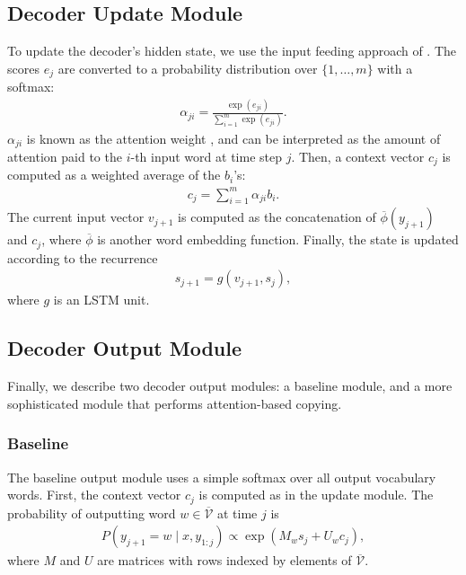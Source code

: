 \documentclass[11pt,letterpaper]{article}
\newcommand{\vocabout}{\overline{\mathcal{V}}}
\newcommand{\phiout}{\overline{\phi}}
\begin{document}
\subsection{Decoder Update Module}
To update the decoder's hidden state,
we use the input feeding approach of .
The scores $e_j$ are converted to a probability distribution 
over $\{1, \dotsc, m\}$ with a softmax:
\begin{align}
  \alpha_{ji} = \frac{\exp(e_{ji})}{\sum_{i=1}^m \exp(e_{ji})}.
\end{align}
$\alpha_{ji}$ is known as the attention weight \cite{bahdanau2014neural},
and can be interpreted as the amount of attention
paid to the $i$-th input word at time step $j$.
Then, a context vector $c_j$ is computed as a weighted average of the $b_i$'s:
\begin{align}
  c_j = \sum_{i=1}^m \alpha_{ji} b_i.
\end{align}
The current input vector $v_{j+1}$ is computed as 
the concatenation of $\phiout(y_{j+1})$ and $c_{j}$,
where $\phiout$ is another word embedding function.
Finally, the state is updated according to the recurrence
\begin{align}
  s_{j+1} = g(v_{j+1}, s_j),
\end{align}
where $g$ is an LSTM unit.

\subsection{Decoder Output Module}
Finally, we describe two decoder output modules: a baseline module, and a
more sophisticated module that performs attention-based copying.

\subsubsection{Baseline}
\label{sec:baseline-output}
The baseline output module uses a simple softmax over all
output vocabulary words.
First, the context vector $c_j$ is computed as in the update module.
The probability of outputting word $w \in \vocabout$ at time $j$ is
\begin{align}
  P(y_{j+1} = w \mid x, y_{1:j}) \propto \exp(M_{w} s_j + U_w c_j),
\end{align}
where $M$ and $U$ are matrices with rows indexed by elements of $\vocabout$.
\end{document}
